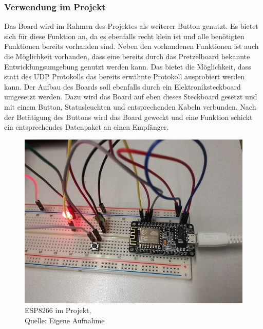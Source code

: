 \subsubsection{Verwendung im Projekt}        
\label{sec:Verwendung des ESP8266} 
Das Board wird im Rahmen des Projektes als weiterer Button genutzt. Es bietet sich für diese Funktion an, da es ebenfalls recht klein ist und alle benötigten Funktionen bereits vorhanden sind. Neben den vorhandenen Funktionen ist auch die Möglichkeit vorhanden, dass eine bereits durch das Pretzelboard bekannte Entwicklungsumgebung genutzt werden kann. Das bietet die Möglichkeit, dass statt des \ac{UDP} Protokolls das bereits erwähnte  Protokoll ausprobiert werden kann. 
Der Aufbau des Boards soll ebenfalls durch ein Elektroniksteckboard umgesetzt werden. Dazu wird das Board auf eben dieses Steckboard gesetzt und mit einem Button, Statusleuchten und entsprechenden Kabeln verbunden. Nach der Betätigung des Buttons wird das Board geweckt und eine Funktion schickt ein entsprechendes Datenpaket an einen Empfänger.
\begin{figure}[!htb]
	\centering
	\includegraphics[scale=0.6]{ESP8266.jpg}
	\caption[ESP8266 im Projekt]{ESP8266 im Projekt,\\ Quelle: Eigene Aufnahme}
\end{figure}
\newpage


 
